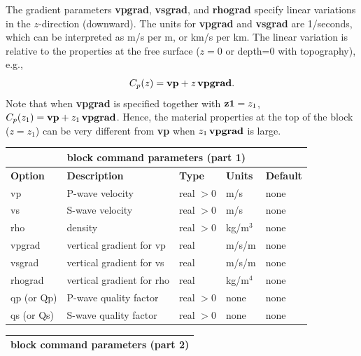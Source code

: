 \documentclass[11pt]{report}
\begin{document}
{The gradient parameters {\bf vpgrad}, {\bf vsgrad}, and {\bf rhograd} specify linear variations in the
$z$-direction (downward). The units for {\bf vpgrad} and {\bf vsgrad} are 1/seconds, which
can be interpreted as m/s per m, or km/s per km. The linear variation is relative to the properties at
the free surface ($z=0$ or depth=0 with topography), e.g.,
\[
	C_p(z) = {\bf vp} + z \, {\bf vpgrad}.
\]
Note that when {\bf vpgrad} is specified together with ${\bf z1}=z_1$, $C_p(z_1) = {\bf vp} + z_1\,
	{\bf vpgrad}$. Hence, the material properties at the top of the block ($z=z_1$) can be very
different from {\bf vp} when $z_1\, {\bf vpgrad}$ is large.
\begin{center}
	\begin{tabular}{|l|p{8cm}|l|l|l|} \hline
		\multicolumn{5}{|c|}{\bf block command parameters (part 1)}                         \\ \hline
		{\bf Option} & {\bf Description}         & {\bf Type} & {\bf Units} & {\bf Default} \\ \hline
		\hline
		vp           & P-wave velocity           & real $>0$  & m/s         & none          \\ \hline
		vs           & S-wave velocity           & real $>0$  & m/s         & none          \\ \hline
		rho          & density                   & real $>0$  & kg/m$^3$    & none          \\ \hline
		vpgrad       & vertical gradient for vp  & real       & m/s/m       & none          \\ \hline
		vsgrad       & vertical gradient for vs  & real       & m/s/m       & none          \\ \hline
		rhograd      & vertical gradient for rho & real       & kg/m$^4$    & none          \\ \hline
		qp (or Qp)   & P-wave quality factor     & real $>0$  & none        & none          \\ \hline
		qs (or Qs)   & S-wave quality factor     & real $>0$  & none        & none          \\ \hline
	\end{tabular}
\end{center}
%
\begin{center}
	\begin{tabular}{|l|p{8cm}|l|l|l|} \hline
		\multicolumn{5}{|c|}{\bf block command parameters (part 2)}                                                                                \\ \hline

\end{tabular}
\end{center}}
\end{document}
